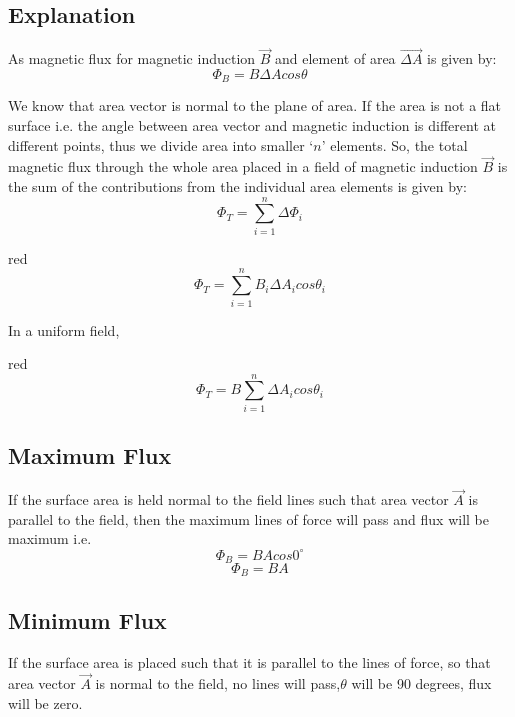 \subsection*{Explanation}
As magnetic flux for magnetic induction $\vec{B}$ and element of area $\vec{\Delta A}$ is given by:
\begin{equation}\nonumber
  \Phi_{B} = B\Delta A cos\theta 
\end{equation}

We know that area vector is normal to the plane of area. If the area is not
a flat surface i.e. the angle between area vector and magnetic induction is
different at different points, thus we divide area into smaller ‘$n$’ elements.
So, the total magnetic flux through the whole area placed in a field of magnetic induction $\vec{B}$ is the sum of the contributions from the individual area elements is given by:
\begin{equation}\nonumber
 \Phi_{T} =  \sum_{i=1}^{n} \Delta \Phi_{i} 
\end{equation}
\begin{mybox}{red}{}
\begin{equation}\label{eq:13.9}
\Phi_{T} =  \sum_{i=1}^{n} B_{i}\Delta A_{i}cos\theta_{i}
\end{equation}
\end{mybox}
\noindent In a uniform field,
\begin{mybox}{red}{}
\begin{equation}\label{eq:13.10}
\Phi_{T} = B \sum_{i=1}^{n} \Delta A_{i}cos\theta_{i}  
\end{equation}
\end{mybox}
\subsection*{Maximum Flux}
If the surface area is held normal to the field lines such that area vector
$\vec{A}$ is parallel to the field, then the maximum lines of force will pass
and flux will be maximum i.e.
\begin{equation}\nonumber
\Phi_{B} =  BA cos0^{\circ} 
\end{equation}
\begin{equation}\nonumber
\Phi_{B} = BA   
\end{equation}

\subsection*{Minimum Flux}
 If the surface area is placed such that it is parallel to the
 lines of force, so that area vector $\vec{A}$ is normal to the field,
 no lines will pass,$\theta$ will be 90 degrees, flux will be zero.
 
